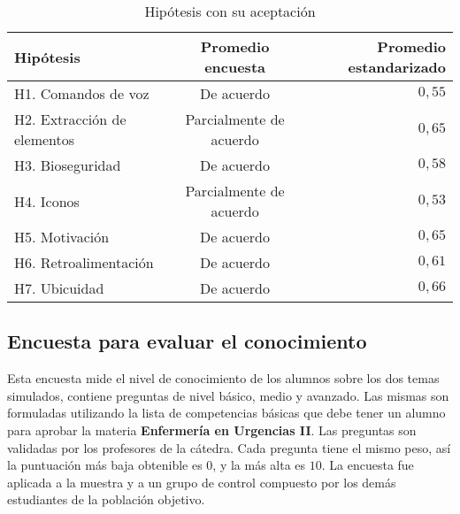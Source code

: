 \begin{table}
\centering
\caption{Hipótesis con su aceptación}
\begin{tabular}{lcr}
\toprule
Hipótesis                   & Promedio encuesta     & Promedio estandarizado \\
\midrule
H1. Comandos de voz         & De acuerdo              & $0,55$ \\
H2. Extracción de elementos & Parcialmente de acuerdo & $0,65$ \\
H3. Bioseguridad            & De acuerdo              & $0,58$ \\
H4. Iconos                  & Parcialmente de acuerdo & $0,53$ \\
H5. Motivación              & De acuerdo              & $0,65$ \\
H6. Retroalimentación       & De acuerdo              & $0,61$ \\
H7. Ubicuidad               & De acuerdo              & $0,66$ \\
\bottomrule
\end{tabular}
\label{tab:resultado_resumen_hipotesis}
\end{table}


\subsection{Encuesta para evaluar el conocimiento}

Esta encuesta mide el nivel de conocimiento de los alumnos sobre los dos temas 
simulados, contiene preguntas de nivel básico, medio y avanzado. Las mismas 
son formuladas utilizando la lista de competencias básicas que debe tener un 
alumno para aprobar la materia \textbf{Enfermería en Urgencias II}. Las 
preguntas son validadas  por los profesores de la cátedra. Cada pregunta 
tiene el mismo peso, así la puntuación más baja obtenible es $0$, y la más 
alta es $10$. La encuesta fue aplicada a la muestra y a un grupo de control 
compuesto por los demás estudiantes de la población objetivo.

